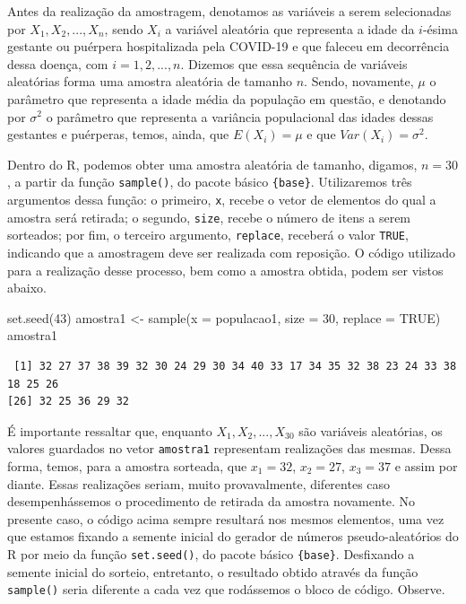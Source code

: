 \documentclass[
  letterpaper,
  DIV=11,
  numbers=noendperiod]{scrreprt}
\newenvironment{Shaded}{\begin{snugshade}}{\end{snugshade}}
\newcommand{\AttributeTok}[1]{\textcolor[rgb]{0.40,0.45,0.13}{#1}}
\newcommand{\ConstantTok}[1]{\textcolor[rgb]{0.56,0.35,0.01}{#1}}
\newcommand{\DecValTok}[1]{\textcolor[rgb]{0.68,0.00,0.00}{#1}}
\newcommand{\FunctionTok}[1]{\textcolor[rgb]{0.28,0.35,0.67}{#1}}
\newcommand{\NormalTok}[1]{\textcolor[rgb]{0.00,0.23,0.31}{#1}}
\newcommand{\OtherTok}[1]{\textcolor[rgb]{0.00,0.23,0.31}{#1}}
\begin{document}
Antes da realização da amostragem, denotamos as variáveis a serem
selecionadas por \(X_1, X_2, ..., X_{n}\), sendo \(X_i\) a variável
aleatória que representa a idade da \(i\)-ésima gestante ou puérpera
hospitalizada pela COVID-19 e que faleceu em decorrência dessa doença,
com \(i = 1, 2, ..., n\). Dizemos que essa sequência de variáveis
aleatórias forma uma amostra aleatória de tamanho \(n\). Sendo,
novamente, \(\mu\) o parâmetro que representa a idade média da população
em questão, e denotando por \(\sigma^2\) o parâmetro que representa a
variância populacional das idades dessas gestantes e puérperas, temos,
ainda, que \(E(X_i) = \mu\) e que \(Var(X_i) = \sigma^2\).

Dentro do R, podemos obter uma amostra aleatória de tamanho, digamos,
\(n = 30\), a partir da função \texttt{sample()}, do pacote básico
\texttt{\{base\}}. Utilizaremos três argumentos dessa função: o
primeiro, \texttt{x}, recebe o vetor de elementos do qual a amostra será
retirada; o segundo, \texttt{size}, recebe o número de itens a serem
sorteados; por fim, o terceiro argumento, \texttt{replace}, receberá o
valor \texttt{TRUE}, indicando que a amostragem deve ser realizada com
reposição. O código utilizado para a realização desse processo, bem como
a amostra obtida, podem ser vistos abaixo.

\begin{Shaded}
\begin{Highlighting}[]
\FunctionTok{set.seed}\NormalTok{(}\DecValTok{43}\NormalTok{)}
\NormalTok{amostra1 }\OtherTok{\textless{}{-}} \FunctionTok{sample}\NormalTok{(}\AttributeTok{x =}\NormalTok{ populacao1, }\AttributeTok{size =} \DecValTok{30}\NormalTok{, }\AttributeTok{replace =} \ConstantTok{TRUE}\NormalTok{)}
\NormalTok{amostra1}
\end{Highlighting}
\end{Shaded}

\begin{verbatim}
 [1] 32 27 37 38 39 32 30 24 29 30 34 40 33 17 34 35 32 38 23 24 33 38 18 25 26
[26] 32 25 36 29 32
\end{verbatim}

É importante ressaltar que, enquanto \(X_1, X_2, ..., X_{30}\) são
variáveis aleatórias, os valores guardados no vetor \texttt{amostra1}
representam realizações das mesmas. Dessa forma, temos, para a amostra
sorteada, que \(x_1 = 32\), \(x_2 = 27\), \(x_3 = 37\) e assim por
diante. Essas realizações seriam, muito provavalmente, diferentes caso
desempenhássemos o procedimento de retirada da amostra novamente. No
presente caso, o código acima sempre resultará nos mesmos elementos, uma
vez que estamos fixando a semente inicial do gerador de números
pseudo-aleatórios do R por meio da função \texttt{set.seed()}, do pacote
básico \texttt{\{base\}}. Desfixando a semente inicial do sorteio,
entretanto, o resultado obtido através da função \texttt{sample()} seria
diferente a cada vez que rodássemos o bloco de código. Observe.
\end{document}
